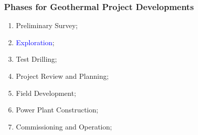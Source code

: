 \documentclass[10pt,compress]{beamer}
\newcommand{\blue}{\textcolor{blue}}
\begin{document}
\begin{frame}
 \frametitle{Phases for Geothermal Project Developments} 
    \begin{enumerate}[1.]
       \item <1-> Preliminary Survey;
       \item <2-> \blue{Exploration}; 
       \item <1-> Test Drilling;
       \item <1-> Project Review and Planning;
       \item <1-> Field Development; 
       \item <1-> Power Plant Construction;
       \item <1-> Commissioning and Operation;
    \end{enumerate}
\end{frame}
\end{document}
